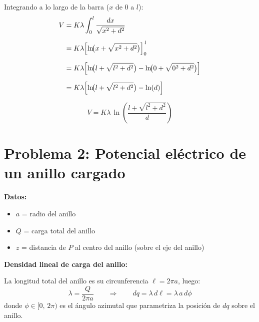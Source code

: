 \documentclass[12pt,letterpaper]{article}
\begin{document}
\bigskip\bigskip

\noindent Integrando a lo largo de la barra ($x$ de $0$ a $l$):
\begin{align*}
    V &= K\lambda \int_0^{l} \frac{dx}{\sqrt{x^2+d^2}} \\[6pt]
      &= K\lambda \Bigl[\ln\!\bigl(x + \sqrt{x^2+d^2}\bigr)\Bigr]_0^{\,l} \\[6pt]
      &= K\lambda \Bigl[\ln\!\bigl(l + \sqrt{l^2+d^2}\bigr)
                       - \ln\!\bigl(0 + \sqrt{0^2+d^2}\bigr)\Bigr] \\[6pt]
      &= K\lambda \Bigl[\ln\!\bigl(l + \sqrt{l^2+d^2}\bigr) - \ln(d)\Bigr]
\end{align*}

\[
    \boxed{V = K\lambda\,\ln\!\left(\frac{l + \sqrt{l^2+d^2}}{d}\right)}
\]

\newpage

\section*{Problema 2: Potencial el\'ectrico de un anillo cargado}

\noindent\textbf{Datos:}
\begin{itemize}
    \item $a$ = radio del anillo
    \item $Q$ = carga total del anillo
    \item $z$ = distancia de $P$ al centro del anillo (sobre el eje del anillo)
\end{itemize}

\bigskip

\noindent\textbf{Densidad lineal de carga del anillo:}

La longitud total del anillo es su circunferencia $\ell = 2\pi a$, luego:
\[
    \lambda = \frac{Q}{2\pi a}
    \qquad\Longrightarrow\qquad
    dq = \lambda\,d\ell = \lambda\,a\,d\phi
\]
donde $\phi \in [0,\,2\pi)$ es el \'angulo azimutal que parametriza la posici\'on de $dq$ sobre el anillo.

\bigskip
\end{document}

